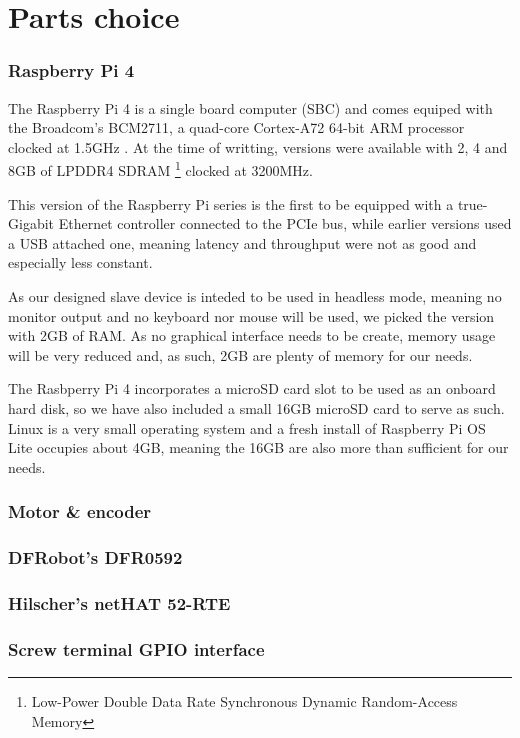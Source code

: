 \section{Parts choice} \label{sec:parts_choice}



\subsubsection{Raspberry Pi 4}
The Raspberry Pi 4 is a single board computer (SBC) and comes equiped with the Broadcom's BCM2711, a quad-core Cortex-A72 64-bit ARM processor clocked at 1.5GHz \cite{technology:rpi4-specs}.
At the time of writting, versions were available with 2, 4 and 8GB of LPDDR4 SDRAM \footnote{Low-Power Double Data Rate Synchronous Dynamic Random-Access Memory} clocked at 3200MHz.

This version of the Raspberry Pi series is the first to be equipped with a true-Gigabit Ethernet controller connected to the PCIe bus, while earlier versions used a USB attached one, meaning latency and throughput were not as good and especially less constant.

As our designed slave device is inteded to be used in headless mode, meaning no monitor output and no keyboard nor mouse will be used, we picked the version with 2GB of RAM.
As no graphical interface needs to be create, memory usage will be very reduced and, as such, 2GB are plenty of memory for our needs.

The Rasbperry Pi 4 incorporates a microSD card slot to be used as an onboard hard disk, so we have also included a small 16GB microSD card to serve as such.
Linux is a very small operating system and a fresh install of Raspberry Pi OS Lite occupies about 4GB, meaning the 16GB are also more than sufficient for our needs.

\subsubsection{Motor \& encoder}


\subsubsection{DFRobot's DFR0592}


\subsubsection{Hilscher's netHAT 52-RTE}


\subsubsection{Screw terminal GPIO interface}

